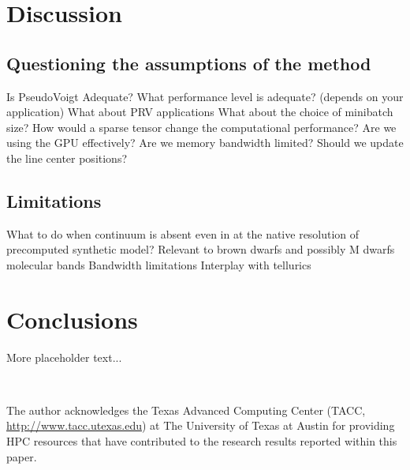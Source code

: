 \documentclass[modern]{aastex631}
\begin{document}
\section{Discussion}

\subsection{Questioning the assumptions of the method}
\begin{outline}
  \1 Is PseudoVoigt Adequate?
  \1 What performance level is adequate? (depends on your application)
  \1 What about PRV applications
  \1 What about the choice of minibatch size?
  \1 How would a sparse tensor change the computational performance?
  \1 Are we using the GPU effectively?  Are we memory bandwidth limited?
  \1 Should we update the line center positions?
\end{outline}

\subsection{Limitations}
\begin{outline}
  \1 What to do when continuum is absent even in at the native resolution of precomputed synthetic model?
  \1 Relevant to brown dwarfs and possibly M dwarfs molecular bands
  \1 Bandwidth limitations
  \1 Interplay with tellurics
\end{outline}

\section{Conclusions}
More placeholder text...


\

\begin{acknowledgements}
  The author acknowledges the Texas Advanced Computing Center (TACC, \url{http://www.tacc.utexas.edu}) at The University of Texas at Austin for providing HPC resources that have contributed to the research results reported within this paper.
\end{acknowledgements}

\clearpage



\end{document}

